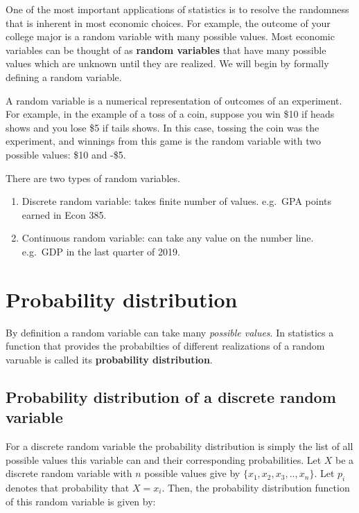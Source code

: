 \documentclass[]{book}
\theoremstyle{definition}
\theoremstyle{definition}
\theoremstyle{definition}
\theoremstyle{remark}
\let\BeginKnitrBlock\begin \let\EndKnitrBlock\end
\begin{document}
One of the most important applications of statistics is to resolve the randomness that is inherent in most economic choices. For example, the outcome of your college major is a random variable with many possible values. Most economic variables can be thought of as \textbf{random variables} that have many possible values which are unknown until they are realized. We will begin by formally defining a random variable.

\BeginKnitrBlock{definition}[Random Variable]
\protect\hypertarget{def:unnamed-chunk-40}{}{\label{def:unnamed-chunk-40} {} }A random variable is a numerical representation of outcomes of an experiment. For example, in the example of a toss of a coin, suppose you win \$10 if heads shows and you lose \$5 if tails shows. In this case, tossing the coin was the experiment, and winnings from this game is the random variable with two possible values: \$10 and -\$5.
\EndKnitrBlock{definition}

There are two types of random variables.

\begin{enumerate}
\def\labelenumi{\arabic{enumi}.}
\item
  Discrete random variable: takes finite number of values. e.g.~GPA points earned in Econ 385.
\item
  Continuous random variable: can take any value on the number line. e.g.~GDP in the last quarter of 2019.
\end{enumerate}

\hypertarget{probability-distribution}{%
\section{Probability distribution}\label{probability-distribution}}

By definition a random variable can take many \emph{possible values}. In statistics a function that provides the probabilties of different realizations of a random varuable is called its \textbf{probability distribution}.

\hypertarget{probability-distribution-of-a-discrete-random-variable}{%
\subsection{Probability distribution of a discrete random variable}\label{probability-distribution-of-a-discrete-random-variable}}

For a discrete random variable the probability distribution is simply the list of all possible values this variable can and their corresponding probabilities. Let \(X\) be a discrete random variable with \(n\) possible values give by \(\{x_1,x_2,x_3,..,x_n\}\). Let \(p_i\) denotes that probability that \(X=x_i\). Then, the probability distribution function of this random variable is given by:
\end{document}
